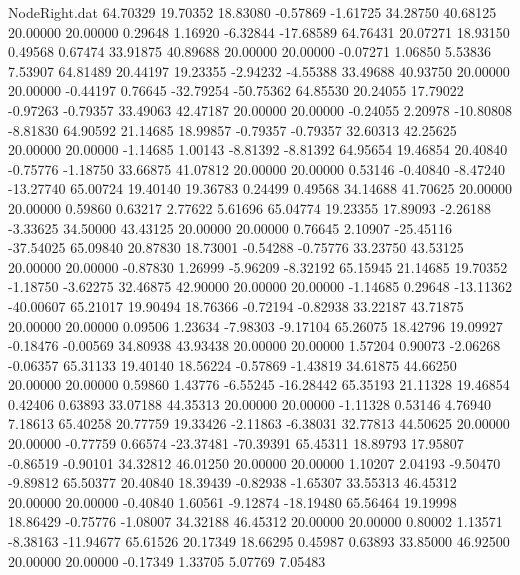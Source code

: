 \begin{filecontents}{NodeRight.dat}
  64.70329   19.70352   18.83080    -0.57869   -1.61725   34.28750   40.68125   20.00000   20.00000    0.29648    1.16920   -6.32844  -17.68589
  64.76431   20.07271   18.93150     0.49568    0.67474   33.91875   40.89688   20.00000   20.00000   -0.07271    1.06850    5.53836    7.53907
  64.81489   20.44197   19.23355    -2.94232   -4.55388   33.49688   40.93750   20.00000   20.00000   -0.44197    0.76645  -32.79254  -50.75362
  64.85530   20.24055   17.79022    -0.97263   -0.79357   33.49063   42.47187   20.00000   20.00000   -0.24055    2.20978  -10.80808   -8.81830
  64.90592   21.14685   18.99857    -0.79357   -0.79357   32.60313   42.25625   20.00000   20.00000   -1.14685    1.00143   -8.81392   -8.81392
  64.95654   19.46854   20.40840    -0.75776   -1.18750   33.66875   41.07812   20.00000   20.00000    0.53146   -0.40840   -8.47240  -13.27740
  65.00724   19.40140   19.36783     0.24499    0.49568   34.14688   41.70625   20.00000   20.00000    0.59860    0.63217    2.77622    5.61696
  65.04774   19.23355   17.89093    -2.26188   -3.33625   34.50000   43.43125   20.00000   20.00000    0.76645    2.10907  -25.45116  -37.54025
  65.09840   20.87830   18.73001    -0.54288   -0.75776   33.23750   43.53125   20.00000   20.00000   -0.87830    1.26999   -5.96209   -8.32192
  65.15945   21.14685   19.70352    -1.18750   -3.62275   32.46875   42.90000   20.00000   20.00000   -1.14685    0.29648  -13.11362  -40.00607
  65.21017   19.90494   18.76366    -0.72194   -0.82938   33.22187   43.71875   20.00000   20.00000    0.09506    1.23634   -7.98303   -9.17104
  65.26075   18.42796   19.09927    -0.18476   -0.00569   34.80938   43.93438   20.00000   20.00000    1.57204    0.90073   -2.06268   -0.06357
  65.31133   19.40140   18.56224    -0.57869   -1.43819   34.61875   44.66250   20.00000   20.00000    0.59860    1.43776   -6.55245  -16.28442
  65.35193   21.11328   19.46854     0.42406    0.63893   33.07188   44.35313   20.00000   20.00000   -1.11328    0.53146    4.76940    7.18613
  65.40258   20.77759   19.33426    -2.11863   -6.38031   32.77813   44.50625   20.00000   20.00000   -0.77759    0.66574  -23.37481  -70.39391
  65.45311   18.89793   17.95807    -0.86519   -0.90101   34.32812   46.01250   20.00000   20.00000    1.10207    2.04193   -9.50470   -9.89812
  65.50377   20.40840   18.39439    -0.82938   -1.65307   33.55313   46.45312   20.00000   20.00000   -0.40840    1.60561   -9.12874  -18.19480
  65.56464   19.19998   18.86429    -0.75776   -1.08007   34.32188   46.45312   20.00000   20.00000    0.80002    1.13571   -8.38163  -11.94677
  65.61526   20.17349   18.66295     0.45987    0.63893   33.85000   46.92500   20.00000   20.00000   -0.17349    1.33705    5.07769    7.05483

\end{filecontents}
